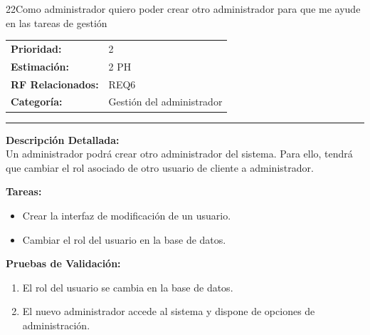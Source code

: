 \begin{hu_card}{22}{Como administrador quiero poder crear otro administrador para que me ayude en las tareas de gestión}
    \begin{tabularx}{\linewidth}{l X}
        \textbf{Prioridad:}   & 2\\
        \textbf{Estimación:}  & 2 PH \\
        \textbf{RF Relacionados:} & REQ6 \\
        \textbf{Categoría:} & Gestión del administrador \\
    \end{tabularx}

    \vspace{2mm}
    \hrule
    \vspace{2mm}

    \textbf{Descripción Detallada:} \\
    Un administrador podrá crear otro administrador del sistema. Para ello, tendrá que cambiar el rol asociado de otro usuario de cliente a administrador.

    \vspace{2mm}
    \textbf{Tareas:}
    \begin{itemize}[noitemsep, topsep=0pt]
        \item Crear la interfaz de modificación de un usuario.
        \item Cambiar el rol del usuario en la base de datos.
    \end{itemize}

    \vspace{2mm}
    \textbf{Pruebas de Validación:}
    \begin{enumerate}[noitemsep, topsep=0pt]
        \item El rol del usuario se cambia en la base de datos.
        \item El nuevo administrador accede al sistema y dispone de opciones de administración.
    \end{enumerate}
\end{hu_card}

